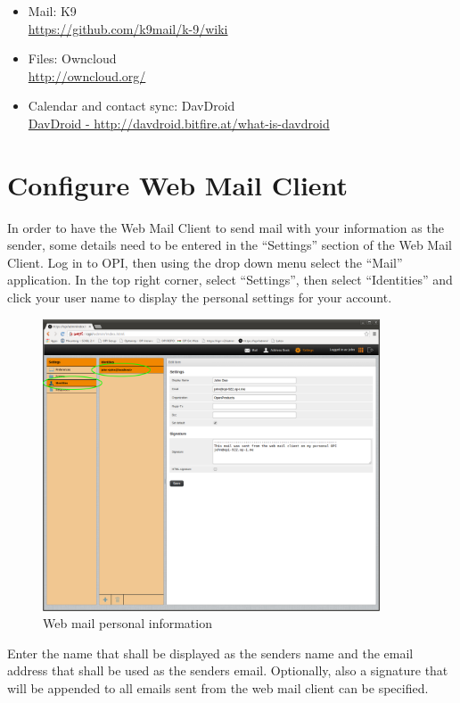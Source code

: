 \documentclass[12pt,a4paper,titlepage]{article}
\begin{document}
\begin{itemize}
\item Mail: K9\\ \href{https://github.com/k9mail/k-9/wiki}{https://github.com/k9mail/k-9/wiki}
\item Files: Owncloud\\ \href{http://owncloud.org/}{http://owncloud.org/}
\item Calendar and contact sync: DavDroid \\ \href{http://davdroid.bitfire.at/what-is-davdroid}{DavDroid - http://davdroid.bitfire.at/what-is-davdroid}
\end{itemize}

\newpage
\section{Configure Web Mail Client}
In order to have the Web Mail Client to send mail with your information as the sender, some details need to be entered in the ``Settings'' section of the Web Mail Client.
Log in to OPI, then using the drop down menu select the ``Mail'' application.
In the top right corner, select ``Settings'', then select ``Identities'' and click your user name to display the personal settings for your account.
\begin{figure}[h]
\centering
\includegraphics[width=10cm]{./img/webmail-config}
\caption{Web mail personal information}
\end{figure}
Enter the name that shall be displayed as the senders name and the email address that shall be used as the senders email.
Optionally, also a signature that will be appended to all emails sent from the web mail client can be specified.
\end{document}
